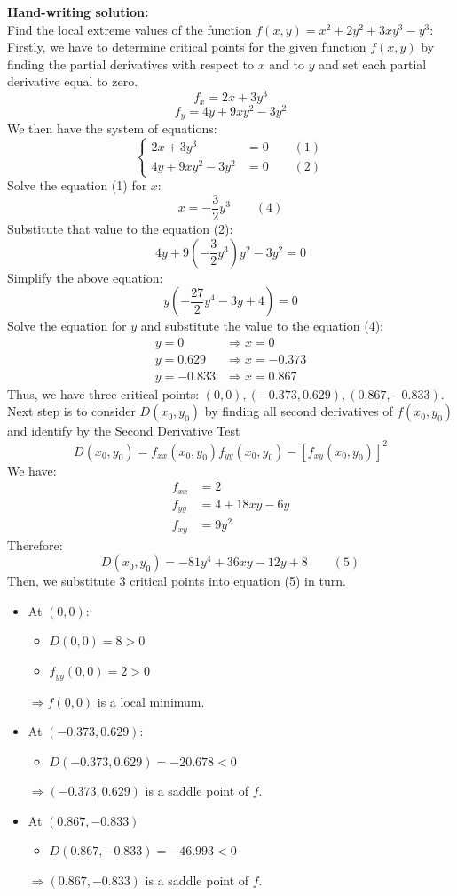 \textbf {Hand-writing solution: }\\[6pt]
Find the local extreme values of the function $f(x,y) = x^2 + 2y^2 + 3xy^3 - y^3 $:\\[6pt]
Firstly, we have to determine critical points for the given function $f(x,y)$ by finding the partial derivatives with respect to $x$ and to $y$ and set each partial derivative equal to zero.
$$ f_x = 2x + 3y^3 $$
$$ f_y = 4y + 9xy^2 - 3y^2 $$
We then have the system of equations:
\[
\begin{cases}
  2x + 3y^3 &= 0 \qquad (1) \\
  4y + 9xy^2 - 3y^2 &= 0 \qquad (2)
\end{cases}
\]
Solve the equation (1) for $x$:
$$ x = -\dfrac{3}{2} y^3 \qquad (4)$$
Substitute that value to the equation (2):
$$ 4y + 9\left( -\dfrac{3}{2} y^3 \right)y^2 - 3y^2 = 0 $$
Simplify the above equation:
$$ y\left( -\dfrac{27}{2}y^4 - 3y + 4 \right) = 0 $$
Solve the equation for $y$ and substitute the value to the equation (4):
\begin{align*}
  y = 0 &\Rightarrow x = 0 \\
  y = 0.629 &\Rightarrow x = -0.373 \\
  y = -0.833 &\Rightarrow x = 0.867 
\end{align*}
Thus, we have three critical points: $(0,0), (-0.373, 0.629), (0.867, -0.833)$.\\[6pt]
Next step is to consider $D(x_0,y_0)$ by finding all second derivatives of $f(x_0,y_0)$ and identify by the Second Derivative Test 
$$ D(x_0,y_0) = f_{xx}(x_0,y_0) f_{yy}(x_0,y_0) - [f_{xy}(x_0,y_0)]^2 $$
We have:
\begin{align*}
  f_{xx} &= 2 \\
  f_{yy} &= 4 + 18xy - 6y \\
  f_{xy} &= 9y^2
\end{align*}
Therefore:
$$ D(x_0,y_0) = -81y^4+36xy-12y+8 \qquad (5)$$
Then, we substitute 3 critical points into equation (5) in turn.
\begin{itemize}
  \item At $ (0,0) $:
    \begin{itemize}
      \item $ D(0,0) = 8 > 0 $
      \item $ f_{yy}(0,0) = 2 > 0$
    \end{itemize}
    $\Rightarrow f(0,0)$ is a local minimum.
  \item At $ (-0.373, 0.629) $:
    \begin{itemize}
      \item $ D(-0.373, 0.629) = -20.678 < 0 $
    \end{itemize}
    $\Rightarrow (-0.373, 0.629)$ is a saddle point of $f$.
  \item At $ (0.867, -0.833) $  
    \begin{itemize}
      \item $ D(0.867, -0.833) = -46.993 < 0 $
    \end{itemize}
    $\Rightarrow (0.867, -0.833)$ is a saddle point of $f$.
\end{itemize}

